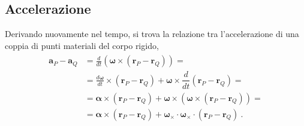 \documentclass[letterpaper,10pt,english]{jupyterBook}
\begin{document}
\subsection{Accelerazione}
\label{\detokenize{ch/kinematics-rigid:accelerazione}}
\sphinxAtStartPar
Derivando nuovamente nel tempo, si trova la relazione tra l’accelerazione di una coppia di punti materiali del corpo rigido,
\begin{equation*}
\begin{split}\begin{aligned}
  \mathbf{a}_P - \mathbf{a}_Q & = \frac{d}{dt} \left( \symbf{\omega} \times ( \mathbf{r}_P - \mathbf{r}_Q )  \right) = \\
                              & = \frac{d \symbf{\omega}}{dt} \times ( \mathbf{r}_P - \mathbf{r}_Q ) + \symbf{\omega} \times \dfrac{d}{dt}( \mathbf{r}_P - \mathbf{r}_Q ) = \\
                              & = \symbf{\alpha} \times ( \mathbf{r}_P - \mathbf{r}_Q ) + \symbf{\omega} \times \left ( \symbf{\omega} \times ( \mathbf{r}_P - \mathbf{r}_Q ) \right) = \\
                              & = \symbf{\alpha} \times ( \mathbf{r}_P - \mathbf{r}_Q ) + \symbf{\omega}_{\times} \cdot  \symbf{\omega}_{\times} \cdot ( \mathbf{r}_P - \mathbf{r}_Q ) \ . 
\end{aligned}\end{split}
\end{equation*}
\sphinxstepscope
\end{document}

